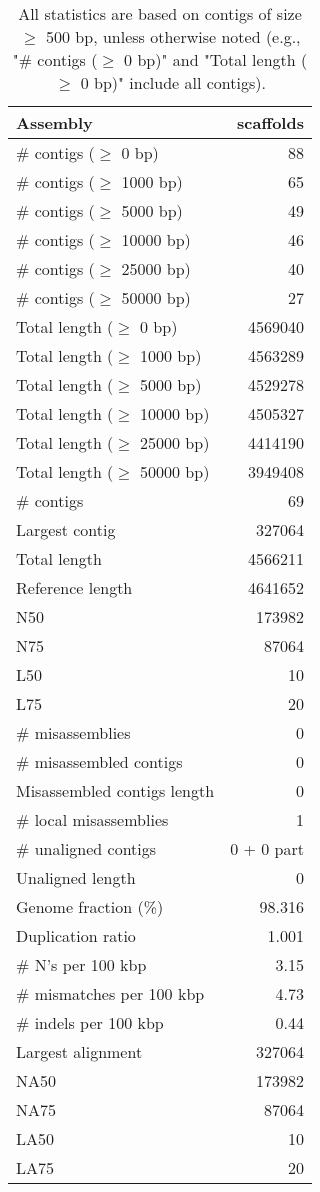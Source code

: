 \documentclass[12pt,a4paper]{article}
\begin{document}
\begin{table}[ht]
\begin{center}
\caption{All statistics are based on contigs of size $\geq$ 500 bp, unless otherwise noted (e.g., "\# contigs ($\geq$ 0 bp)" and "Total length ($\geq$ 0 bp)" include all contigs).}
\begin{tabular}{|l*{1}{|r}|}
\hline
Assembly & scaffolds \\ \hline
\# contigs ($\geq$ 0 bp) & 88 \\ \hline
\# contigs ($\geq$ 1000 bp) & 65 \\ \hline
\# contigs ($\geq$ 5000 bp) & 49 \\ \hline
\# contigs ($\geq$ 10000 bp) & 46 \\ \hline
\# contigs ($\geq$ 25000 bp) & 40 \\ \hline
\# contigs ($\geq$ 50000 bp) & 27 \\ \hline
Total length ($\geq$ 0 bp) & 4569040 \\ \hline
Total length ($\geq$ 1000 bp) & 4563289 \\ \hline
Total length ($\geq$ 5000 bp) & 4529278 \\ \hline
Total length ($\geq$ 10000 bp) & 4505327 \\ \hline
Total length ($\geq$ 25000 bp) & 4414190 \\ \hline
Total length ($\geq$ 50000 bp) & 3949408 \\ \hline
\# contigs & 69 \\ \hline
Largest contig & 327064 \\ \hline
Total length & 4566211 \\ \hline
Reference length & 4641652 \\ \hline
N50 & 173982 \\ \hline
N75 & 87064 \\ \hline
L50 & 10 \\ \hline
L75 & 20 \\ \hline
\# misassemblies & 0 \\ \hline
\# misassembled contigs & 0 \\ \hline
Misassembled contigs length & 0 \\ \hline
\# local misassemblies & 1 \\ \hline
\# unaligned contigs & 0 + 0 part \\ \hline
Unaligned length & 0 \\ \hline
Genome fraction (\%) & 98.316 \\ \hline
Duplication ratio & 1.001 \\ \hline
\# N's per 100 kbp & 3.15 \\ \hline
\# mismatches per 100 kbp & 4.73 \\ \hline
\# indels per 100 kbp & 0.44 \\ \hline
Largest alignment & 327064 \\ \hline
NA50 & 173982 \\ \hline
NA75 & 87064 \\ \hline
LA50 & 10 \\ \hline
LA75 & 20 \\ \hline
\end{tabular}
\end{center}
\end{table}
\end{document}
